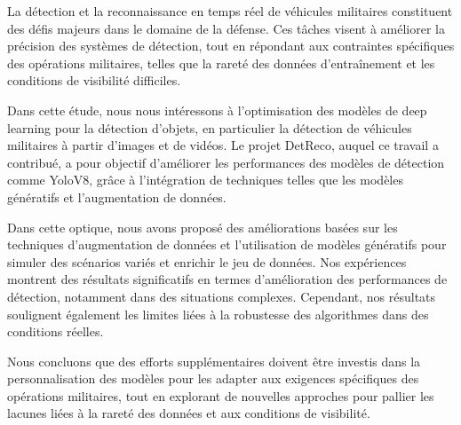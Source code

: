 \sloppy

La détection et la reconnaissance en temps réel de véhicules militaires constituent des défis majeurs dans le domaine de la défense. Ces tâches visent à améliorer la précision des systèmes de détection, tout en répondant aux contraintes spécifiques des opérations militaires, telles que la rareté des données d'entraînement et les conditions de visibilité difficiles.

Dans cette étude, nous nous intéressons à l’optimisation des modèles de deep learning pour la détection d’objets, en particulier la détection de véhicules militaires à partir d’images et de vidéos. Le projet DetReco, auquel ce travail a contribué, a pour objectif d’améliorer les performances des modèles de détection comme YoloV8, grâce à l'intégration de techniques telles que les modèles génératifs et l'augmentation de données.

Dans cette optique, nous avons proposé des améliorations basées sur les techniques d’augmentation de données et l’utilisation de modèles génératifs pour simuler des scénarios variés et enrichir le jeu de données. Nos expériences montrent des résultats significatifs en termes d'amélioration des performances de détection, notamment dans des situations complexes. Cependant, nos résultats soulignent également les limites liées à la robustesse des algorithmes dans des conditions réelles.

Nous concluons que des efforts supplémentaires doivent être investis dans la personnalisation des modèles pour les adapter aux exigences spécifiques des opérations militaires, tout en explorant de nouvelles approches pour pallier les lacunes liées à la rareté des données et aux conditions de visibilité.